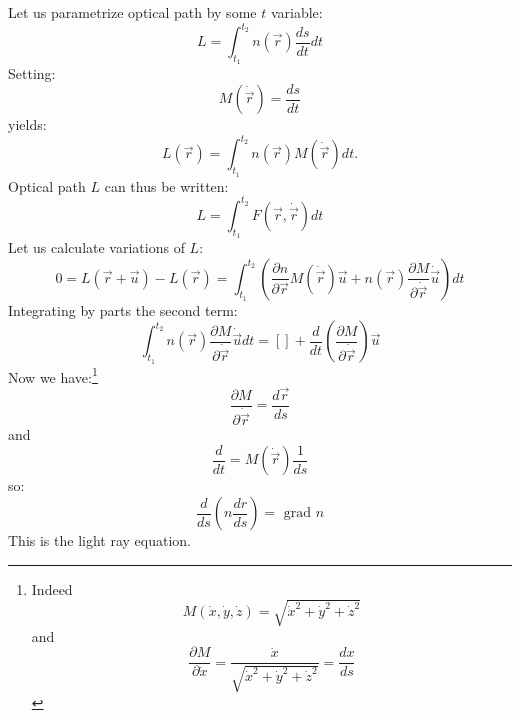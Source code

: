 \documentclass[12pt]{book}
\begin{document}
\begin{pf}
Let us parametrize optical path by some $t$ variable:
\begin{equation}
L=\int_{t_1}^{t_2} n(\vec r) \frac{ds}{dt}dt
\end{equation}
Setting:
\begin{equation}
M(\dot{\vec r})=\frac{ds}{dt} 
\end{equation}
yields:
\begin{equation}
L(\vec r)=\int_{t_1}^{t_2} n(\vec r) M(\dot{\vec r})dt.
\end{equation}
Optical path $L$ can thus be written:
\begin{equation}
L=\int_{t_1}^{t_2} F(\vec r,\dot{\vec r})dt
\end{equation}
Let us calculate variations of $L$:
\begin{equation}
0=L(\vec r + \vec u)-L(\vec r )=\int_{t_1}^{t_2} (\frac{\partial
n}{\partial \vec r} M(\dot{\vec r}) \vec u+n(\vec r) \frac{\partial
M}{\partial \dot{\vec r}}\dot{\vec u}) dt
\end{equation}
Integrating by parts the second term:
\begin{equation}
\int_{t_1}^{t_2}n(\vec r) \frac{\partial M}{\partial \dot{\vec
r}}\dot{\vec u} dt=[]+\frac{d}{dt}( \frac{\partial M}{\partial \dot{\vec
r}})\vec u
\end{equation}
Now we have:\footnote{%
Indeed
\begin{equation}
M(\dot x,\dot y, \dot z)=\sqrt{\dot x^2+\dot y^2+\dot z^2}
\end{equation}
and
\begin{equation}
\frac{\partial M}{\partial \dot x}=\frac{\dot x}{\sqrt{\dot x^2+\dot y^2+\dot z^2}}=\frac{dx}{ds}
\end{equation}
}%
\begin{equation}
\frac{\partial M}{\partial \dot{\vec r}}=\frac{d\vec r}{ds}
\end{equation}
and
\begin{equation}
\frac{d}{dt}={M(\dot{\vec r})}\frac{1}{ds}
\end{equation}
so:
\begin{equation}
\frac{d}{ds}(n\frac{dr}{ds})=\mbox{ grad } n
\end{equation}
This is the light ray equation.
\end{pf}
\end{document}
